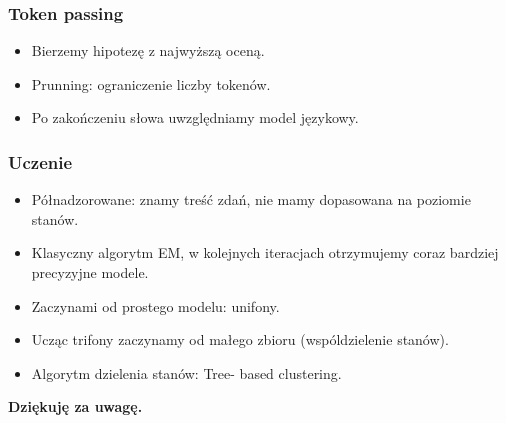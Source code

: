 \documentclass[mathserif, serif]{beamer}
\begin{document}
	\begin{frame}
		\frametitle{Token passing}
		\footnotesize
		
		\begin{itemize}
			\item Bierzemy hipotezę z najwyższą oceną.
			\item Prunning: ograniczenie liczby tokenów.
			\item Po zakończeniu słowa uwzględniamy model językowy.
		\end{itemize}
		
	\end{frame}

	\begin{frame}
		\frametitle{Uczenie}
		\footnotesize
		
		\begin{itemize}
			\item Półnadzorowane: znamy treść zdań, nie mamy dopasowana na poziomie stanów.
			\item Klasyczny algorytm EM, w kolejnych iteracjach otrzymujemy coraz bardziej precyzyjne modele.
			\item Zaczynami od prostego modelu: unifony.
			\item Ucząc trifony zaczynamy od małego zbioru (wspóldzielenie stanów).
			\item Algorytm dzielenia stanów: Tree- based clustering.
		\end{itemize}
		
	\end{frame}

	\begin{frame}
		\huge
		\begin{exampleblock}{}
			\textbf{Dziękuję za uwagę.}
		\end{exampleblock}
		
	\end{frame}
\end{document}
